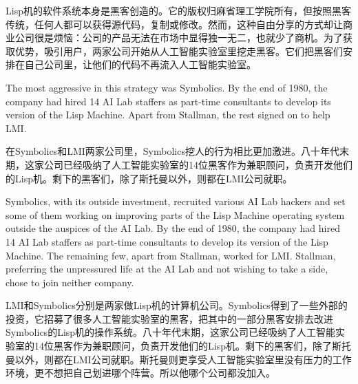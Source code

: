 \ifdefined\chs
Lisp机的软件系统本身是黑客创造的。它的版权归麻省理工学院所有，但按照黑客传统，任何人都可以获得源代码，复制或修改。然而，这种自由分享的方式却让商业公司很是烦恼：公司的产品无法在市场中显得独一无二，也就少了商机。为了获取优势，吸引用户，两家公司开始从人工智能实验室里挖走黑客。它们把黑客们安排在自己公司里，让他们的代码不再流入人工智能实验室。
\fi

\ifdefined\eng
The most aggressive in this strategy was Symbolics. By the end of 1980, the company had hired 14 AI Lab staffers as part-time consultants to develop its version of the Lisp Machine. Apart from Stallman, the rest signed on to help LMI.
\fi

\ifdefined\chs
在Symbolics和LMI两家公司里，Symbolics挖人的行为相比更加激进。八十年代末期，这家公司已经吸纳了人工智能实验室的14位黑客作为兼职顾问，负责开发他们的Lisp机。剩下的黑客们，除了斯托曼以外，则都在LMI公司就职。
\fi
\fi

\ifdefined\vtwo
\ifdefined\eng
Symbolics, with its outside investment, recruited various AI Lab hackers and set some of them working on improving parts of the Lisp Machine operating system outside the auspices of the AI Lab. By the end of 1980, the company had hired 14 AI Lab staffers as part-time consultants to develop its version of the Lisp Machine. The remaining few, apart from Stallman, worked for LMI.  Stallman, preferring the unpressured life at the AI Lab and not wishing to take a side, chose to join neither company.
\fi

\ifdefined\chs
LMI和Symbolics分别是两家做Lisp机的计算机公司。Symbolics得到了一些外部的投资，它招募了很多人工智能实验室的黑客，把其中的一部分黑客安排去改进Symbolics的Lisp机的操作系统。八十年代末期，这家公司已经吸纳了人工智能实验室的14位黑客作为兼职顾问，负责开发他们的Lisp机。剩下的黑客们，除了斯托曼以外，则都在LMI公司就职。斯托曼则更享受人工智能实验室里没有压力的工作环境，更不想把自己划进哪个阵营。所以他哪个公司都没加入。
\fi
\fi

